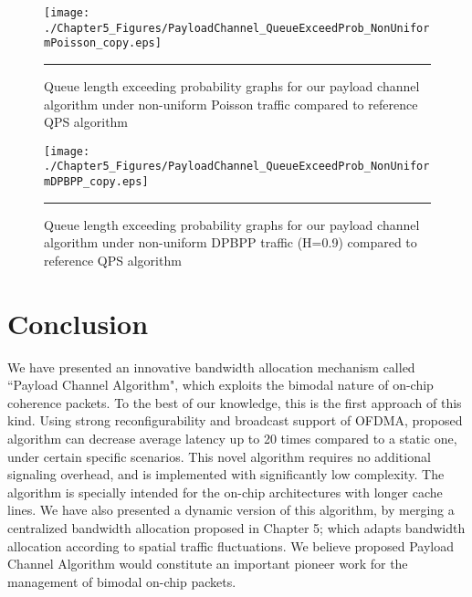 \begin{figure}[htbp]
  \centering
    \texttt{[image: ./Chapter5\_Figures/PayloadChannel\_QueueExceedProb\_NonUniformPoisson\_copy.eps]}
    \rule{35em}{0.5pt}
  \caption[Queue length exceeding probability graphs for our payload channel algorithm under non-uniform Poisson traffic compared to reference QPS algorithm]{Queue length exceeding probability graphs for our payload channel algorithm under non-uniform Poisson traffic compared to reference QPS algorithm}
  \label{fig:Electron}
\end{figure}

\begin{figure}[htbp]
  \centering
    \texttt{[image: ./Chapter5\_Figures/PayloadChannel\_QueueExceedProb\_NonUniformDPBPP\_copy.eps]}
    \rule{35em}{0.5pt}
  \caption[Queue length exceeding probability graphs for our payload channel algorithm under non-uniform DPBPP traffic (H=0.9) compared to reference QPS algorithm]{Queue length exceeding probability graphs for our payload channel algorithm under non-uniform DPBPP traffic (H=0.9) compared to reference QPS algorithm}
  \label{fig:Electron}
\end{figure}


\section{Conclusion}


We have presented an innovative bandwidth allocation mechanism called ``Payload Channel Algorithm", which exploits the bimodal nature of on-chip coherence packets. To the best of our knowledge, this is the first approach of this kind. Using strong reconfigurability and broadcast support of OFDMA, proposed algorithm can decrease average latency up to 20 times compared to a static one, under certain specific scenarios. This novel algorithm requires no additional signaling overhead, and is implemented with significantly low complexity. The algorithm is specially intended for the on-chip architectures with longer cache lines. We have also presented a dynamic version of this algorithm, by merging a centralized bandwidth allocation proposed in Chapter 5; which adapts bandwidth allocation according to spatial traffic fluctuations. We believe proposed Payload Channel Algorithm would constitute an important pioneer work for the management of bimodal on-chip packets. 